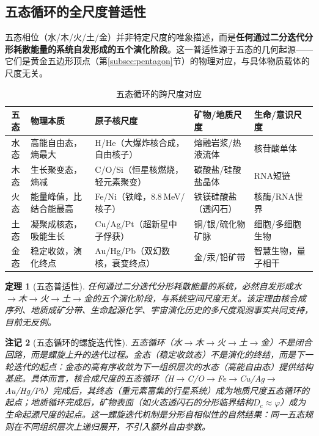 \documentclass[12pt,a4paper,twocolumn]{article}
\renewcommand{\phi}{\varphi}
\newtheorem{theorem}{定理}[section]
\newtheorem{remark}[theorem]{注记}
\begin{document}
\subsection{五态循环的全尺度普适性}
\label{subsec:five_states_universal}

五态相位（水/木/火/土/金）并非特定尺度的唯象描述，而是\textbf{任何通过二分迭代分形耗散能量的系统自发形成的五个演化阶段}。这一普适性源于五态的几何起源——它们是黄金五边形顶点（第\ref{subsec:pentagon}节）的物理对应，与具体物质载体的尺度无关。

\begin{table}[H]
\centering
\footnotesize
\caption{五态循环的跨尺度对应}
\label{tab:five_states_cross_scale}
\begin{tabular}{c|p{2.5cm}|p{2.5cm}|p{2.5cm}|p{2.5cm}}
\hline
\textbf{五态} & \textbf{物理本质} & \textbf{原子核尺度} & \textbf{矿物/地质尺度} & \textbf{生命/意识尺度} \\
\hline
水态 & 高能自由态，熵最大 & H/He（大爆炸核合成，自由核子） & 熔融岩浆/热液流体 & 核苷酸单体 \\
木态 & 生长聚变态，熵减 & C/O/Si（恒星核燃烧，轻元素聚变） & 碳酸盐/硅酸盐晶体 & RNA短链 \\
火态 & 能量峰值，比结合能最高 & Fe/Ni（铁峰，8.8\,MeV/核子） & 铁镁硅酸盐（透闪石） & 核酶/RNA世界 \\
土态 & 凝聚成核态，吸能生长 & Cu/Ag/Pt（超新星中子俘获） & 铜/银/硫化物矿脉 & 细胞/多细胞生物 \\
金态 & 稳定收敛，演化终点 & Au/Hg/Pb（双幻数核，衰变终点） & 金/汞/铅矿带 & 智慧生物，量子相干 \\
\hline
\end{tabular}
\end{table}

\begin{theorem}[五态普适性]
\label{thm:five_states_universal}
任何通过二分迭代分形耗散能量的系统，必然自发形成水$\to$木$\to$火$\to$土$\to$金的五个演化阶段，与系统空间尺度无关。该定理由核合成序列、地质成矿分带、生命起源化学、宇宙演化历史的多尺度观测事实共同支持，目前无反例。
\end{theorem}

\begin{remark}[五态循环的螺旋迭代性]
五态循环（水$\to$木$\to$火$\to$土$\to$金）不是闭合回路，而是螺旋上升的迭代过程。金态（稳定收敛态）不是演化的终结，而是下一轮迭代的起点：金态的高有序收敛为下一组织层次的水态（高能自由态）提供结构基底。具体而言，核合成尺度的五态循环（H$\to$C/O$\to$Fe$\to$Cu/Ag$\to$Au/Hg/Pb）完成后，其终态（重元素富集的行星系统）成为地质尺度五态循环的起点；地质循环完成后，矿物表面（如火态透闪石的分形临界结构$D_c\approx\phi$）成为生命起源尺度的起点。这一螺旋迭代机制是分形自相似性的自然结果：同一五态规则在不同组织层次上递归展开，不引入额外自由参数。
\end{remark}
\end{document}

